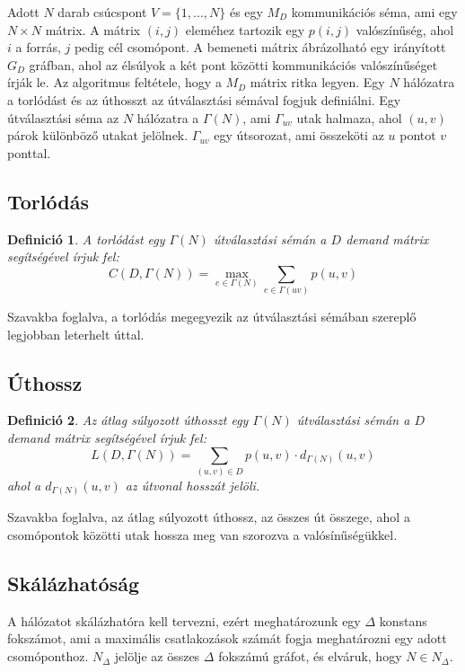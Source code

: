 \documentclass[12pt]{report}
\newtheorem{mydef}{Definició}
\begin{document}
Adott $N$ darab csúcspont  $V = \{1, ..., N\}$  és egy $M_D$ kommunikációs séma, ami egy $N\times N$ mátrix.
A mátrix $(i, j)$ eleméhez tartozik egy $p(i, j)$ valószínűség, ahol $i$ a forrás, $j$ pedig cél csomópont.
A bemeneti mátrix ábrázolható egy irányított $G_D$ gráfban, ahol az élsúlyok a két pont közötti kommunikációs valószínűséget írják le.
Az algoritmus feltétele, hogy a \(M_D\) mátrix ritka legyen.
Egy $N$ hálózatra a torlódást és az úthosszt az útválasztási sémával fogjuk definiálni.
Egy útválasztási séma az $N$ hálózatra a $\Gamma(N)$, ami $\Gamma_{uv}$ utak halmaza, ahol $(u, v)$ párok különböző utakat jelölnek.
$\Gamma_{uv}$ egy útsorozat, ami összeköti az $u$ pontot $v$ ponttal.

\subsection{Torlódás}

\begin{mydef}
	A torlódást egy \(\Gamma(N)\) útválasztási sémán a \(D\) demand mátrix segítségével írjuk fel: \[C(D, \Gamma(N)) = \max_{e \in \Gamma(N)}  \sum_{e \in \Gamma(uv)} p(u,v) \]
\end{mydef}

Szavakba foglalva, a torlódás megegyezik az útválasztási sémában szereplő legjobban leterhelt úttal.

\subsection{Úthossz}

\begin{mydef}
	Az átlag súlyozott úthosszt egy \(\Gamma(N)\) útválasztási sémán a \(D\) demand mátrix segítségével írjuk fel: \[L(D, \Gamma(N)) = \sum_{(u,v) \in D}  p(u,v)  \cdot d_{\Gamma(N)}(u, v) \] ahol a \(d_{\Gamma(N)}(u, v)\) az útvonal hosszát jelöli.
\end{mydef}

Szavakba foglalva, az átlag súlyozott úthossz, az összes út összege, ahol a csomópontok közötti utak hossza meg van szorozva a valósínűségükkel. 

\subsection{Skálázhatóság}

A hálózatot skálázhatóra kell tervezni, ezért meghatározunk egy \(\Delta\) konstans fokszámot, ami a maximális csatlakozások számát fogja meghatározni egy adott csomóponthoz.
\(N_\Delta\) jelölje az összes \(\Delta\) fokszámú gráfot, és elváruk, hogy \(N \in N_\Delta\).
\end{document}

